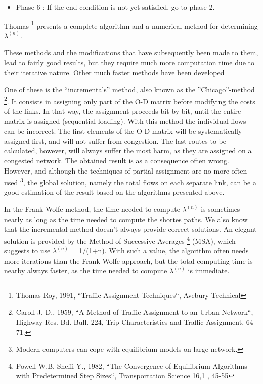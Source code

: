 \begin{itemize}
\item Phase 6 : If the end condition is not yet satisfied, go to phase 2.
\end{itemize}


Thomas \footnote {Thomas Roy, 1991, ``Traffic Assignment Techniques``, Avebury
Technical} presents a complete algorithm and a numerical method for determining
$\lambda^{(n)}$.



These methods and the modifications that have subsequently been made to them,
lead to fairly good results, but they require much more computation time due to their
iterative nature.  Other much faster methods have been developed

One of these is the ``incrementals''  method, also known as the
''Chicago''-method \footnote {Caroll J. D., 1959, ``A Method of Traffic
Assignment to an Urban Network``, Highway Res. Bd.
Bull. 224, Trip Characteristics and Traffic Assignment, 64-71.}. It consists in
assigning only part of the O-D matrix before modifying the costs of the links.
In that way, the assignment proceeds bit by bit, until the entire matrix is
assigned (sequential loading).  With this method the individual flows can be
incorrect. The first elements of the O-D matrix will be systematically assigned
first, and will not suffer from congestion.  The last routes to be calculated,
however, will always suffer the most harm, as they are assigned on a congested
network. The obtained result is as a consequence often wrong.  However, and
although the techniques of partial assignment are no more often used \footnote
{Modern computers can cope with equilibrium models on  large network.}, the
global solution, namely the total flows on each separate link, can be a good
estimation of the result based on the algorithms presented above.

In the Frank-Wolfe method, the time needed to compute $\lambda^{(n)}$ is
sometimes nearly as long as the time needed to compute the shortes paths.
We also know that the incremental method doesn't always provide correct
solutions.
An elegant solution is provided by the Method of Successive Averages
\footnote{Powell W.B, Sheffi Y., 1982, ``The Convergence of Equilibrium
Algorithms with Predetermined Step Sizes``, Transportation Science 16,1 , 45-55
} (MSA), which suggests to use $\lambda^{(n)}$ = 1/(1+n). With such a value, the
algorithm often needs more iterations than the Frank-Wolfe approach, but the
total computing time is nearby always faster, as the time needed to compute
$\lambda^{(n)}$ is immediate.

